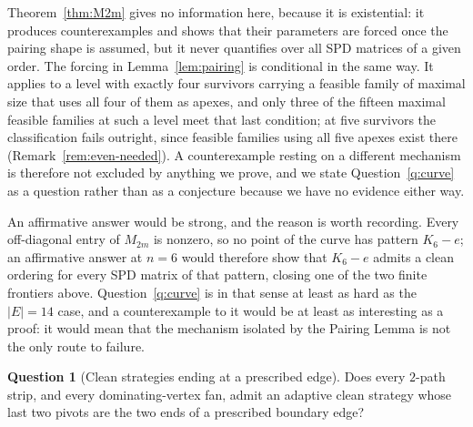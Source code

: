 \documentclass[11pt]{article}
\theoremstyle{plain}
\theoremstyle{definition}
\newtheorem{question}[theorem]{Question}
\begin{document}
\begin{humanblock}
Theorem~\ref{thm:M2m} gives no information here, because it is existential: it produces
counterexamples and shows that their parameters are forced once the pairing shape is assumed, but it
never quantifies over all SPD matrices of a given order. The forcing in Lemma~\ref{lem:pairing} is
conditional in the same way. It applies to a level with exactly four survivors carrying a feasible
family of maximal size that uses all four of them as apexes, and only three of the fifteen maximal
feasible families at such a level meet that last condition; at five survivors the classification fails
outright, since feasible families using all five apexes exist there
(Remark~\ref{rem:even-needed}). A counterexample resting on a different mechanism is therefore not
excluded by anything we prove, and we state Question~\ref{q:curve} as a question rather than as a
conjecture because we have no evidence either way.

An affirmative answer would be strong, and the reason is worth recording. Every off-diagonal entry of
$M_{2m}$ is nonzero, so no point of the curve has pattern $K_6-e$; an affirmative answer at $n=6$ would
therefore show that $K_6-e$ admits a clean ordering for every SPD matrix of that pattern, closing one
of the two finite frontiers above. Question~\ref{q:curve} is in that sense at least as hard as the
$|E|=14$ case, and a counterexample to it would be at least as interesting as a proof: it would mean
that the mechanism isolated by the Pairing Lemma is not the only route to failure.

\begin{question}[Clean strategies ending at a prescribed edge]\label{q:cliquesum}
Does every $2$-path strip, and every dominating-vertex fan, admit an adaptive clean strategy whose
last two pivots are the two ends of a prescribed boundary edge?
\end{question}


\end{humanblock}
\end{document}
